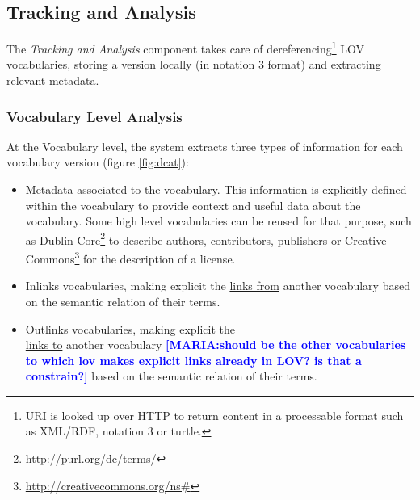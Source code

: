 \documentclass{iosart2c}
\newcommand{\maria}[1]{\textcolor{blue}{\textbf{[MARIA:#1]}}}
\begin{document}
\subsection{Tracking and Analysis}
	The \emph{Tracking and Analysis} component takes care of dereferencing\footnote{URI is looked up over HTTP to return content in a processable format such as XML/RDF, notation 3 or turtle.} LOV vocabularies, storing a version locally (in notation 3 format) and extracting relevant metadata.

\subsubsection{Vocabulary Level Analysis}
At the Vocabulary level, the system extracts three types of information for each vocabulary version (figure \ref{fig:dcat}):
\begin{itemize}
\item Metadata associated to the vocabulary. This information is explicitly defined within the vocabulary to provide context and useful data about the vocabulary. Some high level vocabularies can be reused for that purpose, such as Dublin Core\footnote{\url{http://purl.org/dc/terms/}} to describe authors, contributors, publishers or Creative Commons\footnote{\url{http://creativecommons.org/ns\#}} for the description of a license.

\item Inlinks vocabularies, making explicit the \underline{links from} another vocabulary based on the semantic relation of their terms.

\item Outlinks vocabularies, making explicit the\\ \underline{links to} another vocabulary \maria{should be the other vocabularies to which lov makes explicit links already in LOV? is that a constrain?} based on the semantic relation of their terms.
\end{itemize}
\end{document}
